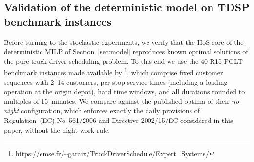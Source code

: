 
\subsection{Validation of the deterministic model on TDSP benchmark instances}
\label{sec:validation}

Before turning to the stochastic experiments, we verify that the HoS core of
the deterministic MILP of Section~\ref{sec:model} reproduces known optimal
solutions of the pure truck driver scheduling problem. To this end we use the
40 R15-PGLT benchmark instances made available by
\citet{garaix_label-setting_2024}\footnote{\url{https://emse.fr/~garaix/TruckDriverSchedule/Expert_Systems/}},
which comprise fixed customer sequences with 2--14 customers, per-stop service
times (including a loading operation at the origin depot), hard time windows,
and all durations rounded to multiples of 15~minutes. We compare against the
published optima of their \emph{no-night} configuration, which enforces
exactly the daily provisions of Regulation~(EC) No~561/2006 and Directive
2002/15/EC considered in this paper, without the night-work rule.

